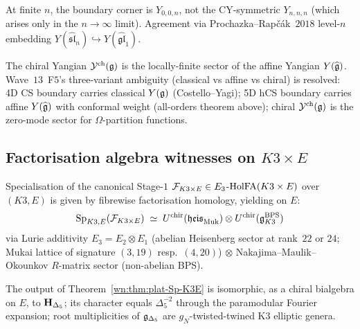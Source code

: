 \begin{corollary}
\label{wn:cor:plat-corner}
At finite $n$, the boundary corner is $Y_{0, 0, n}$, not the CY-symmetric
$Y_{n, n, n}$ (which arises only in the $n \to \infty$ limit).
Agreement via Prochazka--Rapčák~$2018$ level-$n$ embedding
$Y(\widehat{\mathfrak{sl}}_n) \hookrightarrow Y(\widehat{\mathfrak{gl}}_1)$.
\end{corollary}

\begin{remark}
\label{wn:rmk:plat-chiral-yangian}
The chiral Yangian $\mathcal{Y}^{\mathrm{ch}}(\mathfrak{g})$ is the locally-finite
sector of the affine Yangian $Y(\widehat{\mathfrak{g}})$. Wave~$13$~F$5$'s
three-variant ambiguity (classical vs affine vs chiral) is resolved:
4D CS boundary carries classical $Y(\mathfrak{g})$ (Costello--Yagi);
5D hCS boundary carries affine $Y(\widehat{\mathfrak{g}})$ with conformal weight
(all-orders theorem above);
chiral $\mathcal{Y}^{\mathrm{ch}}(\mathfrak{g})$ is the zero-mode sector for
$\Omega$-partition functions.
\end{remark}

\subsection{Factorisation algebra witnesses on $K3 \times E$}
\label{wn:subsec:plat-K3E-witnesses}

\begin{theorem}[Explicit $\Sp_{K3, E}$]\ClaimStatusTheorem
\label{wn:thm:plat-Sp-K3E}
Specialisation of the canonical Stage-$1$ $\mathcal{F}_{K3 \times E}
\in E_3$-$\mathrm{HolFA}(K3 \times E)$ over $(K3, E)$ is given by
fibrewise factorisation homology, yielding on $E$:
\[
\mathrm{Sp}_{K3, E}(\mathcal{F}_{K3 \times E}) \;\simeq\;
U^{\mathrm{chir}}(\mathfrak{heis}_{\mathrm{Muk}}) \otimes
U^{\mathrm{chir}}(\mathfrak{g}^{\mathrm{BPS}}_{K3})
\]
via Lurie additivity $E_3 = E_2 \otimes E_1$ (abelian Heisenberg sector
at rank~$22$ or $24$; Mukai lattice of signature $(3, 19)$ resp.\
$(4, 20)$) $\otimes$ Nakajima--Maulik--Okounkov $R$-matrix sector
(non-abelian BPS).
\end{theorem}

\begin{conjecture}
\label{wn:conj:plat-lorgat-2020}
The output of Theorem~\ref{wn:thm:plat-Sp-K3E} is isomorphic, as a
chiral bialgebra on $E$, to $\mathbf{H}_{\Delta_5}$; its character equals
$\Delta_5^{-2}$ through the paramodular Fourier expansion; root
multiplicities of $\mathfrak{g}_{\Delta_5}$ are $g_N$-twisted-twined K3 elliptic
genera.
\end{conjecture}

